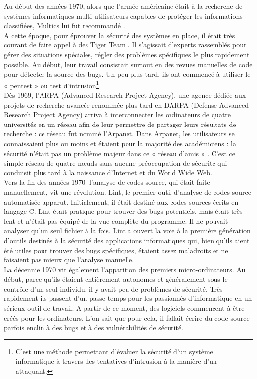 Au début des années 1970, alors que l’armée américaine était à la recherche de systèmes informatiques multi utilisateurs capables de protéger les informations classifiées, Multics lui fut recommandé \cite{b2}.\\
A cette époque, pour éprouver la sécurité des systèmes en place, il était très courant de faire appel à des Tiger Team \cite{infosec-history}. Il s’agissait d’experts rassemblés pour gérer des situations spéciales, régler des problèmes spécifiques le plus rapidement possible. Au début, leur travail consistait surtout en des revues manuelles de code pour détecter la source des bugs. Un peu plus tard, ils ont commencé à utiliser le «  pentest » ou test d’intrusion\footnote{C’est une méthode permettant d’évaluer la sécurité d’un système informatique à travers des tentatives d’intrusion à la manière d’un attaquant.}.\\ 
Dès 1969, l’ARPA (Advanced Research Project Agency), une agence dédiée aux projets de recherche avancée renommée plus tard en DARPA (Defense Advanced Research Project Agency) arriva à interconnecter les ordinateurs de quatre universités en un réseau afin de leur permettre de partager leurs résultats de recherche : ce réseau fut nommé l’Arpanet. Dans Arpanet, les utilisateurs se connaissaient plus ou moins et étaient pour la majorité des académiciens : la sécurité n’était pas un problème majeur dans ce « réseau d’amis » \cite{arpanet}. C’est ce simple réseau de quatre nœuds sans aucune préoccupation de sécurité qui conduisit plus tard à la naissance d’Internet et du World Wide Web. \\
Vers la fin des années 1970, l’analyse de codes source, qui était faite manuellement, vit une révolution. Lint, le premier outil d’analyse de codes source automatisée apparut. Initialement, il était destiné aux codes sources écrits en langage C. Lint était pratique pour trouver des bugs potentiels, mais était très lent et n'était pas équipé de la vue complète du programme. Il ne pouvait analyser qu'un seul fichier à la fois. Lint a ouvert la voie à la première génération d’outils destinés à la sécurité des applications informatiques qui, bien qu'ils aient été utiles pour trouver des bugs spécifiques, étaient assez maladroits et ne faisaient pas mieux que l'analyse manuelle.\\
La décennie 1970 vit également l’apparition des premiers micro-ordinateurs. Au début, parce qu’ils étaient entièrement autonomes et généralement sous le contrôle d'un seul individu, il y avait peu de problèmes de sécurité. Très rapidement ils passent d'un passe-temps pour les passionnés d'informatique en un sérieux outil de travail. A partir de ce moment, des logiciels commencent à être créés pour les ordinateurs. L’on sait que pour cela, il fallait écrire du code source parfois enclin à des bugs et à des vulnérabilités de sécurité.\\
